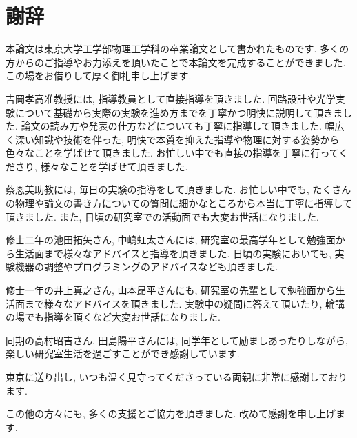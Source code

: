 \documentclass[uplatex, dvipdfmx, a4paper, report, papersize, 11pt]{jsbook}
\begin{document}
\newpage
\chapter*{謝辞}
本論文は東京大学工学部物理工学科の卒業論文として書かれたものです. 多くの方からのご指導やお力添えを頂いたことで本論文を完成することができました. この場をお借りして厚く御礼申し上げます. \par
吉岡孝高准教授には, 指導教員として直接指導を頂きました. 回路設計や光学実験について基礎から実際の実験を進め方までを丁寧かつ明快に説明して頂きました. 論文の読み方や発表の仕方などについても丁寧に指導して頂きました. 幅広く深い知識や技術を伴った, 明快で本質を抑えた指導や物理に対する姿勢から色々なことを学ばせて頂きました. お忙しい中でも直接の指導を丁寧に行ってくださり, 様々なことを学ばせて頂きました. \par
蔡恩美助教には, 毎日の実験の指導をして頂きました. お忙しい中でも, たくさんの物理や論文の書き方についての質問に細かなところから本当に丁寧に指導して頂きました. また, 日頃の研究室での活動面でも大変お世話になりました. \par
修士二年の池田拓矢さん, 中嶋虹太さんには, 研究室の最高学年として勉強面から生活面まで様々なアドバイスと指導を頂きました. 日頃の実験においても, 実験機器の調整やプログラミングのアドバイスなども頂きました. \par
修士一年の井上真之さん, 山本昂平さんにも, 研究室の先輩として勉強面から生活面まで様々なアドバイスを頂きました. 実験中の疑問に答えて頂いたり, 輪講の場でも指導を頂くなど大変お世話になりました. \par
同期の高村昭吉さん, 田島陽平さんには, 同学年として励ましあったりしながら, 楽しい研究室生活を過ごすことができ感謝しています. \par
東京に送り出し, いつも温く見守ってくださっている両親に非常に感謝しております. \par
この他の方々にも, 多くの支援とご協力を頂きました. 改めて感謝を申し上げます.

\end{document}
